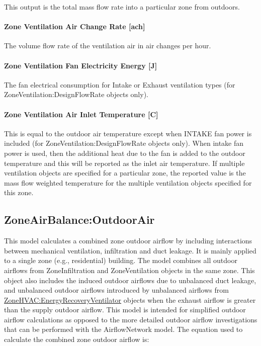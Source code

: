 This output is the total mass flow rate into a particular zone from outdoors.

\paragraph{Zone Ventilation Air Change Rate {[}ach{]}}\label{zone-ventilation-air-change-rate-ach}

The volume flow rate of the ventilation air in air changes per hour.

\paragraph{Zone Ventilation Fan Electricity Energy {[}J{]}}\label{zone-ventilation-fan-electric-energy-j}

The fan electrical consumption for Intake or Exhaust ventilation types (for ZoneVentilation:DesignFlowRate objects only).

\paragraph{Zone Ventilation Air Inlet Temperature {[}C{]}}\label{zone-ventilation-air-inlet-temperature-c}

This is equal to the outdoor air temperature except when INTAKE fan power is included (for ZoneVentilation:DesignFlowRate objects only). When intake fan power is used, then the additional heat due to the fan is added to the outdoor temperature and this will be reported as the inlet air temperature. If multiple ventilation objects are specified for a particular zone, the reported value is the mass flow weighted temperature for the multiple ventilation objects specified for this zone.

\subsection{ZoneAirBalance:OutdoorAir}\label{zoneairbalanceoutdoorair}

This model calculates a combined zone outdoor airflow by including interactions between mechanical ventilation, infiltration and duct leakage. It is mainly applied to a single zone (e.g., residential) building. The model combines all outdoor airflows from ZoneInfiltration and ZoneVentilation objects in the same zone. This object also includes the induced outdoor airflows due to unbalanced duct leakage, and unbalanced outdoor airflows introduced by unbalanced airflows from \hyperref[zonehvacenergyrecoveryventilator]{ZoneHVAC:EnergyRecoveryVentilator} objects when the exhaust airflow is greater than the supply outdoor airflow. This model is intended for simplified outdoor airflow calculations as opposed to the more detailed outdoor airflow investigations that can be performed with the AirflowNetwork model. The equation used to calculate the combined zone outdoor airflow is:

